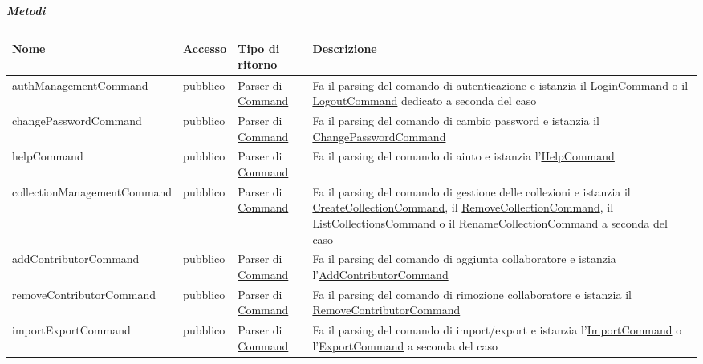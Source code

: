 \documentclass{scalatekids-article}
\begin{document}
\subparagraph{Metodi}

\begin{tabular}{| p{5.5cm} | p{1.5cm} | p{2cm} | p{7.5cm} |}
  \hline
  Nome & Accesso & Tipo di ritorno & Descrizione\\
  \hline
  authManagementCommand & pubblico & Parser di \hyperref[sec:actorbase::cli::models::Command]{Command} & Fa il parsing del comando di autenticazione e istanzia il \hyperref[sec:actorbase::cli::models::LoginCommand]{LoginCommand} o il \hyperref[sec:actorbase::cli::models::LogoutCommand]{LogoutCommand} dedicato a seconda del caso\\
  \hline
  changePasswordCommand & pubblico & Parser di \hyperref[sec:actorbase::cli::models::Command]{Command} & Fa il parsing del comando di cambio password e istanzia il \hyperref[sec:actorbase::cli::models::ChangePasswordCommand]{ChangePasswordCommand}\\
  \hline
  helpCommand & pubblico & Parser di \hyperref[sec:actorbase::cli::models::Command]{Command} & Fa il parsing del comando di aiuto e istanzia l'\hyperref[sec:actorbase::cli::models::HelpCommand]{HelpCommand}\\
  \hline
  collectionManagementCommand & pubblico & Parser di \hyperref[sec:actorbase::cli::models::Command]{Command} & Fa il parsing del comando di gestione delle collezioni e istanzia il \hyperref[sec:actorbase::cli::models::CreateCollectionCommand]{CreateCollectionCommand}, il \hyperref[sec:actorbase::cli::models::RemoveCollectionCommand]{RemoveCollectionCommand}, il \hyperref[sec:actorbase::cli::models::ListCollectionsCommand]{ListCollectionsCommand} o il \hyperref[sec:actorbase::cli::models::RenameCollectionCommand]{RenameCollectionCommand} a seconda del caso\\
  \hline
  addContributorCommand & pubblico & Parser di \hyperref[sec:actorbase::cli::models::Command]{Command} & Fa il parsing del comando di aggiunta collaboratore e istanzia l'\hyperref[sec:actorbase::cli::models::AddContributorCommand]{AddContributorCommand}\\
  \hline
  removeContributorCommand & pubblico & Parser di \hyperref[sec:actorbase::cli::models::Command]{Command} & Fa il parsing del comando di rimozione collaboratore e istanzia il \hyperref[sec:actorbase::cli::models::RemoveContributorCommand]{RemoveContributorCommand}\\
  \hline
  importExportCommand & pubblico & Parser di \hyperref[sec:actorbase::cli::models::Command]{Command} & Fa il parsing del comando di import/export e istanzia l'\hyperref[sec:actorbase::cli::models::ImportCommand]{ImportCommand} o l'\hyperref[sec:actorbase::cli::models::ExportCommand]{ExportCommand} a seconda del caso\\

\end{tabular}
\end{document}
